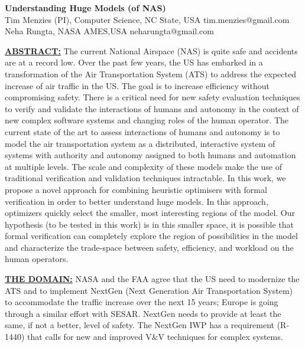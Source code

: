 \documentclass[12pt]{article}
\begin{document}
 
\begin{center}
{\Large {\bf  Understanding Huge  Models (of NAS)}}\\
Tim Menzies (PI), Computer Science, NC State, USA tim.menzies@gmail.com\\ 
Neha Rungta,  NASA AMES,USA  neharungta@gmail.com
\end{center}
\noindent
\underline{{\bf ABSTRACT:}}  
The current National Airspace (NAS) is quite safe and accidents are at a record low. Over the past few years, the US has embarked in a transformation of the Air Transportation System (ATS) to address the expected increase of air traffic in the US. The goal is to increase efficiency without compromising safety. There is a critical need for new safety evaluation techniques to verify and validate the interactions of humans and autonomy in the context of new complex software systems and changing roles of the human operator. 
The current state of the art to assess interactions of humans and autonomy is to model the air transportation system as a distributed, interactive system of systems with authority and autonomy assigned to both humans and automation at multiple levels. The scale and complexity of these models make the use of traditional verification and validation techniques intractable. In this work, we propose a novel approach for combining heuristic optimisers with formal verification in order to better understand huge models. In this approach,  optimizers quickly select the smaller, most interesting regions of the model. Our hypothesis (to be tested in this work) is in this smaller space, it is possible that formal verification can completely explore the region of possibilities in the model and  characterize the trade-space between safety, efficiency, and workload on the human operators.

\underline{{\bf THE DOMAIN:}}
NASA and the FAA agree that the US need to modernize the ATS and to implement NextGen (Next Generation Air Transportation System) to accommodate the traffic increase over the next 15 years; Europe is going through a similar effort with SESAR. NextGen needs to provide at least the same, if not a better, level of safety. The  NextGen IWP has a requirement (R-1440) that calls for new and improved V\&V techniques for complex systems. 
\end{document}
